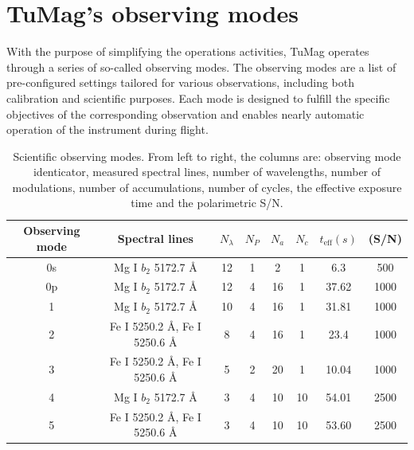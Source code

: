 \section{TuMag's observing modes}

With the purpose of simplifying the operations activities, TuMag operates through a series of so-called observing modes. The observing modes are a list of pre-configured settings tailored for various observations, including both calibration and scientific purposes. Each mode is designed to fulfill the specific objectives of the corresponding observation and enables nearly automatic operation of the instrument during flight.

\begin{table}
    \centering
   \begin{tabular}{cccccccc}
    \hline
    \hline
    Observing mode & Spectral lines  & $N_\lambda$ & $N_P$ & $N_a$& $N_c$ & $t_{\text{eff}} (s)$ & (S/N) \\
    \hline
    0s & Mg I $b_2$ 5172.7 \r{A} & 12 & 1 & 2 & 1 & 6.3 & 500\\ 
    0p & Mg I $b_2$ 5172.7 \r{A} & 12 & 4 & 16 & 1 & 37.62 & 1000\\
    1  & Mg I $b_2$ 5172.7 \r{A} &  10 & 4 & 16 & 1 & 31.81 & 1000\\
    2  & Fe I 5250.2 \r{A}, Fe I 5250.6 \r{A} &  8 & 4 & 16 & 1 & 23.4 & 1000\\
    3  & Fe I 5250.2 \r{A}, Fe I 5250.6 \r{A} & 5 & 2 & 20 & 1 & 10.04 & 1000\\
    4  & Mg I $b_2$ 5172.7 \r{A} & 3 & 4 & 10 & 10 & 54.01 & 2500\\
    5  & Fe I 5250.2 \r{A}, Fe I 5250.6 \r{A} & 3 & 4 & 10 & 10 & 53.60 & 2500\\ 
    \hline
    \hline
    \end{tabular}
    \caption{Scientific observing modes. From left to right, the columns are: observing mode identicator, measured spectral lines, number of wavelengths, number of modulations, number of accumulations, number of cycles, the effective exposure time and the polarimetric S/N.}
    \label{table: scientific observing modes}
\end{table}

